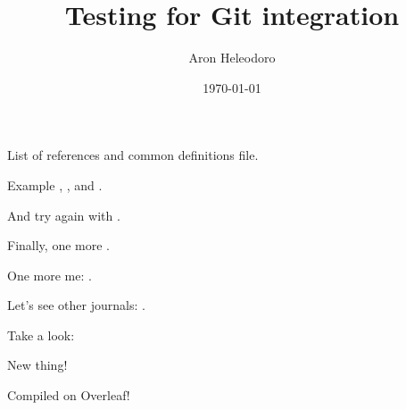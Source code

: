 \documentclass{article}
\title{Testing for Git integration}
\author{Aron Heleodoro}
\date{\today}
\begin{document}
\maketitle

List of references and common definitions file.

Example \cite{benjamin_hennion_higher_2017}, \cite{heleodoro_geometry_2018}, \cite{Raskin-D-modules} and \cite{HA}.

And try again with \cite{heleodoro_geometry_2018}.

Finally, one more \cite{elmanto2020nilpotent}.

One more me: \cite{heleodoro2020prestacks}.

Let's see other journals: \cite{AGH}.

Take a look: \cites{shirane2020double,shirane2020arXiv201009243S}

New thing!

Compiled on Overleaf!

% 
% 

\printbibliography
\end{document}
